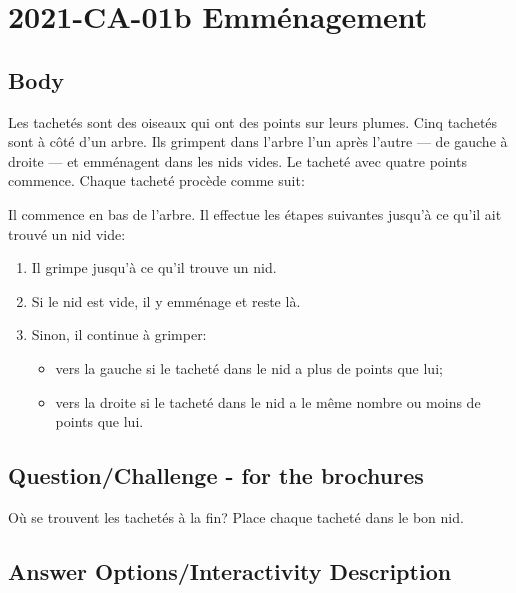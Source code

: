 \documentclass[a4paper,11pt]{report}
\newcommand{\taskGraphicsFolder}{..}
\begin{document}
\section*{\centering{} 2021-CA-01b Emménagement}


\subsection*{Body}

Les tachetés sont des oiseaux qui ont des points sur leurs plumes. Cinq tachetés sont à côté d’un arbre. Ils grimpent dans l’arbre l’un après l’autre — de gauche à droite — et emménagent dans les nids vides. Le tacheté avec quatre points commence. Chaque tacheté procède comme suit:

Il commence en bas de l’arbre. Il effectue les étapes suivantes jusqu’à ce qu’il ait trouvé un nid vide:

\begin{enumerate}
  \item Il grimpe jusqu’à ce qu’il trouve un nid.
  \item Si le nid est vide, il y emménage et reste là.
  \item Sinon, il continue à grimper:

\begin{itemize}
  \item vers la gauche si le tacheté dans le nid a plus de points que lui;
  \item vers la droite si le tacheté dans le nid a le même nombre ou moins de points que lui.
\end{itemize}


\end{enumerate}

{\em


\subsection*{Question/Challenge - for the brochures}

Où se trouvent les tachetés à la fin? Place chaque tacheté dans le bon nid.

{\centering%
\par}

}

\begingroup
\renewcommand{\arraystretch}{1.5}
\subsection*{Answer Options/Interactivity Description}
\end{document}
